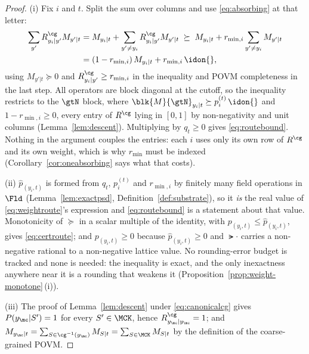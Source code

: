 \begin{proof}
(i) Fix $i$ and $t$. Split the sum over columns and use \eqref{eq:absorbing}
at that letter:
\begin{align*}
  \sum_{y'}R^{\cg}_{y_i|y'}M_{y'|t}
  &=M_{y_i|t}+\sum_{y'\ne y_i}R^{\cg}_{y_i|y'}M_{y'|t}
  \;\succeq\;M_{y_i|t}+r_{\min,i}\sum_{y'\ne y_i}M_{y'|t}\\
  &=(1-r_{\min,i})\,M_{y_i|t}+r_{\min,i}\,\idon{},
\end{align*}
using $M_{y'|t}\succeq0$ and $R^{\cg}_{y_i|y'}\ge r_{\min,i}$ in the
inequality and POVM completeness in the last step. All operators are block
diagonal at the cutoff, so the inequality restricts to the $\gtN$ block, where
$\blk{M}{\gtN}_{y_i|t}\succeq p^{(t)}_i\,\idon{}$ and $1-r_{\min,i}\ge0$, every
entry of $R^{\cg}$ lying in $[0,1]$ by non-negativity and unit columns
(Lemma~\ref{lem:descent}). Multiplying by $q_t\ge0$ gives
\eqref{eq:routebound}. Nothing in the argument couples the entries: each $i$
uses only its own row of $R^{\cg}$ and its own weight, which is why $r_{\min}$
must be indexed (Corollary~\ref{cor:oneabsorbing} says what that costs).

(ii) $\hat p_{(y_i,t)}$ is formed from $q_t$, $p^{(t)}_i$ and $r_{\min,i}$ by
finitely many field operations in $\Fld$ (Lemma~\ref{lem:exactpsd},
Definition~\ref{def:substrate}), so it \emph{is} the real value of
\eqref{eq:weightroute}'s expression and \eqref{eq:routebound} is a statement
about that value. Monotonicity of $\succeq$ in a scalar multiple of the
identity, with $p_{(y_i,t)}\le\hat p_{(y_i,t)}$, gives \eqref{eq:certroute};
and $p_{(y_i,t)}\ge0$ because $\hat p_{(y_i,t)}\ge0$ and $\lat{\cdot}$ carries
a non-negative rational to a non-negative lattice value. No rounding-error
budget is tracked and none is needed: the inequality is exact, and the only
inexactness anywhere near it is a rounding that weakens it
(Proposition~\ref{prop:weight-monotone}\,(i)).

(iii) The proof of Lemma~\ref{lem:descent} under \eqref{eq:canonicalcg} gives
$P(y_{\mc}|S')=1$ for every $S'\in\MCK$, hence
$R^{\cg}_{y_{\mc}|y_{\mc}}=1$; and
$M_{y_{\mc}|t}=\sum_{S\in\cg^{-1}(y_{\mc})}M_{S|t}=\sum_{S\in\MCK}M_{S|t}$ by
the definition of the coarse-grained POVM.


\end{proof}
